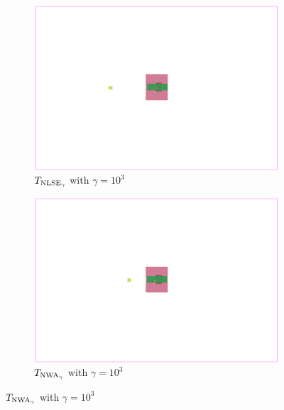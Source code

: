 \begin{figure}[t]
 \centering

 \begin{subfigure}{.48\textwidth}
  \includegraphics[width=\textwidth]{start_vectors/convergence_Chip1_LSE_center_1000_gamma.png}  
  \caption{\(T_{\operatorname{NLSE}_\gamma}\) with \(\gamma = 10^3\)}
 \end{subfigure}
 \hfill
 \begin{subfigure}{.48\textwidth}
  \includegraphics[width=\textwidth]{start_vectors/convergence_Chip1_WA_center_1000_gamma.png}  
  \caption{\(T_{\operatorname{NWA}_\gamma}\) with \(\gamma = 10^3\)}
 \end{subfigure}
 
 \bigskip
 

\end{figure}
